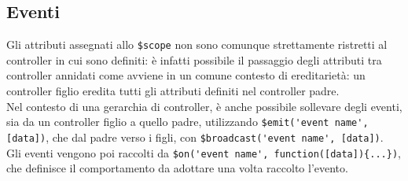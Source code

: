 \subsection{Eventi} 
Gli attributi assegnati allo \lstinline[language=HTML]!$scope! non sono comunque strettamente ristretti al controller in cui sono definiti: è infatti possibile il passaggio degli attributi tra controller annidati come avviene in un comune contesto di ereditarietà: un controller figlio eredita tutti gli attributi definiti nel controller padre.\\ 
Nel contesto di una gerarchia di controller, è anche possibile sollevare degli eventi, sia da un controller figlio a quello padre, utilizzando \lstinline[language=HTML]!$emit('event name', [data])!, che dal padre verso i figli, con \lstinline[language=HTML]!$broadcast('event name', [data])!.\\
Gli eventi vengono poi raccolti da \lstinline[language=HTML]!$on('event name', function([data]){...})!, che definisce il comportamento da adottare una volta raccolto l'evento.\\

